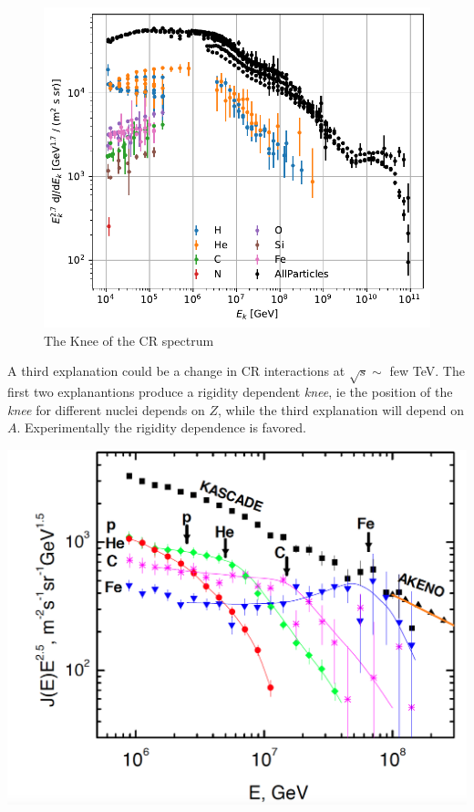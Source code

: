 \documentclass[
  letterpaper,
  DIV=11,
  numbers=noendperiod]{scrreprt}
\begin{document}
\begin{figure}[H]

{\centering \includegraphics{chap2_files/figure-pdf/cell-12-output-1.pdf}

}

\caption{The Knee of the CR spectrum}

\end{figure}%

A third explanation could be a change in CR interactions at
\({\sqrt s}\sim\) few TeV. The first two explanantions produce a
rigidity dependent \emph{knee}, ie the position of the \emph{knee} for
different nuclei depends on \(Z\), while the third explanation will
depend on \(A\). Experimentally the rigidity dependence is favored.

\includegraphics{images/knee.png}
\end{document}
